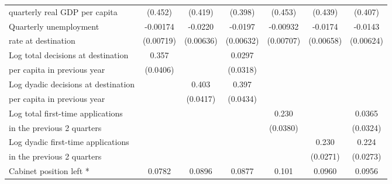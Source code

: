 \begin{table}[htbp]
\begin{tabular}{l*{6}{c}}
quarterly real GDP per capita                    &     (0.452)         &     (0.419)         &     (0.398)         &     (0.453)         &     (0.439)         &     (0.407)         \\
[0,5em]
Quarterly unemployment&    -0.00174         &     -0.0220\sym{**} &     -0.0197\sym{**} &    -0.00932         &     -0.0174\sym{*}  &     -0.0143\sym{*}  \\
 rate at destination                    &   (0.00719)         &   (0.00636)         &   (0.00632)         &   (0.00707)         &   (0.00658)         &   (0.00624)         \\
[0,5em]
Log total decisions at destination &       0.357\sym{***}&                     &      0.0297         &                     &                     &                     \\
per capita in previous year                    &    (0.0406)         &                     &    (0.0318)         &                     &                     &                     \\
[0,5em]
Log dyadic decisions at destination &                     &       0.403\sym{***}&       0.397\sym{***}&                     &                     &                     \\
per capita in previous year                    &                     &    (0.0417)         &    (0.0434)         &                     &                     &                     \\
[0,5em]
Log total first-time applications &                     &                     &                     &       0.230\sym{***}&                     &      0.0365         \\
in the previous 2 quarters                    &                     &                     &                     &    (0.0380)         &                     &    (0.0324)         \\
[0,5em]
Log dyadic first-time applications&                     &                     &                     &                     &       0.230\sym{***}&       0.224\sym{***}\\
 in the previous 2 quarters                    &                     &                     &                     &                     &    (0.0271)         &    (0.0273)         \\
[0,5em]
Cabinet position left *&      0.0782\sym{*}  &      0.0896\sym{*}  &      0.0877\sym{*}  &       0.101\sym{**} &      0.0960\sym{**} &      0.0956\sym{**} \\

\end{tabular}
\end{table}
